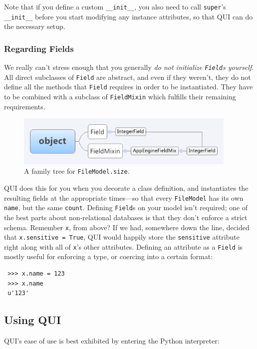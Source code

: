 \documentclass{article} %
\newenvironment{inset}
{
\begin{center}
\begin{minipage}{0.85\textwidth}
}
{
\end{minipage}
\end{center}
}
\newcommand{\il}[1]{\lstinline{#1}}
\begin{document}
Note that if you define a custom \il{__init__}, you also need to call \il{super}'s \il{__init__}  before you start modifying any instance attributes, so that QUI can do the necessary setup.

\subsubsection{Regarding Fields}
We really can't stress enough that you generally \emph{do not initialize \il{Field}s yourself}. All direct subclasses of \il{Field} are abstract, and even if they weren't, they do not define all the methods that \il{Field} requires in order to be instantiated. They have to be combined with a subclass of \il{FieldMixin} which fulfills their remaining requirements.

\begin{figure}[htb]
\centering
\includegraphics[width=400px]{IntegerFieldlInheritanceTreeforFileModel}
\caption{A family tree for \il{FileModel.size}.}
\end{figure}
 QUI does this for you when you decorate a class definition, and instantiates the resulting fields at the appropriate times---so that every \il{FileModel} has its own \il{name}, but the same \il{count}.
Defining \il{Field}s on your model isn't required; one of the best parts about non-relational databases is that they don't enforce a strict schema. Remember \il{x}, from above? If we had,
somewhere down the line, decided that \il{x.sensitive = True}, QUI would happily store the \il{sensitive} attribute right along with all of \il{x}'s other attributes. Defining an attribute as a
\il{Field} is mostly useful for enforcing a type, or coercing into a certain format:
\begin{inset}
\begin{lstlisting}
 >>> x.name = 123
 >>> x.name
 u'123'
\end{lstlisting}
\end{inset}

\subsection{Using QUI}
QUI's ease of use is best exhibited by entering the Python interpreter:
\end{document}
